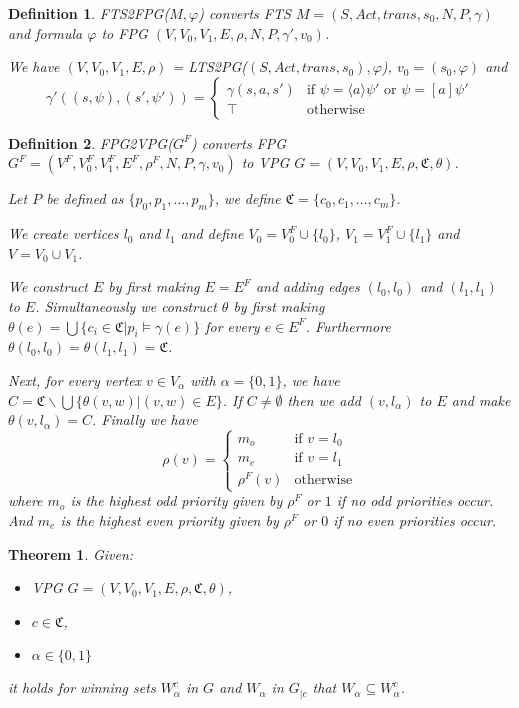 \documentclass[]{article}
\newtheorem{definition}{Definition}[section]
\newtheorem{theorem}{Theorem}[section]
\begin{document}
\begin{definition}
	FTS2FPG($M, \varphi$) converts FTS $M = (S, Act, trans, s_0, N, P, \gamma)$ and formula $\varphi$ to FPG $(V, V_0, V_1, E, \rho, N, P, \gamma', v_0)$.
	
	We have $(V, V_0, V_1, E, \rho)$ = LTS2PG($(S, Act, trans, s_0), \varphi$), $v_0 = (s_0, \varphi)$ and
	\[ \gamma'((s, \psi),(s', \psi')) = \begin{cases}
	\gamma(s,a,s') & \text{if }\psi = \langle a \rangle \psi'\text{ or }\psi = [a]\psi' \\
	\top & \text{otherwise}
	\end{cases}\]
\end{definition}

\begin{definition}
	FPG2VPG($G^F$) converts FPG $G^F = (V^F, V_0^F, V_1^F, E^F, \rho^F, N, P, \gamma, v_0)$ to VPG $G = (V, V_0, V_1, E, \rho, \mathfrak{C}, \theta)$.
	
	Let $P$ be defined as  $\{p_0, p_1, \dots, p_m\}$, we define $\mathfrak{C} = \{c_0, c_1, \dots, c_m\}$.
	
	We create vertices $l_0$ and $l_1$ and define $V_0 = V_0^F \cup \{l_0\}$, $V_1 = V_1^F \cup \{l_1\}$ and $V = V_0 \cup V_1$.
	
	We construct $E$ by first making $E = E^F$ and adding edges $(l_0, l_0)$ and $(l_1, l_1)$ to $E$. Simultaneously we construct $\theta$ by first making $\theta(e) = \bigcup\{c_i \in \mathfrak{C} | p_i \models \gamma(e)\}$ for every $e \in E^F$. Furthermore $\theta(l_0,l_0) = \theta(l_1,l_1) = \mathfrak{C}$.
	
	Next, for every vertex $v \in V_\alpha$ with $\alpha = \{0,1\}$, we have $C = \mathfrak{C} \backslash \bigcup \{\theta(v,w)|(v,w) \in E\}$. If $C \neq \emptyset$ then we add $(v, l_\alpha)$ to $E$ and make $\theta(v,l_\alpha) = C$.
	Finally we have 
	\[ \rho(v) = \begin{cases}
	m_o  & \text{if } v = l_0 \\
	m_e & \text{if } v = l_1 \\
	\rho^F(v) &\text{otherwise}
	\end{cases} \]
	where $m_o$ is the highest odd priority given by $\rho^F$ or $1$ if no odd priorities occur. And $m_e$ is the highest even priority given by $\rho^F$ or $0$ if no even priorities occur.
\end{definition}
\begin{theorem}
	\label{vpgproj}
	Given:
	\begin{itemize}
		\item VPG $G = (V,V_0, V_1, E, \rho, \mathfrak{C}, \theta)$,
		\item $c \in \mathfrak{C}$,
		\item $\alpha \in \{0,1\}$
	\end{itemize}
	it holds for winning sets $W_\alpha^c$ in $G$ and $W_\alpha$ in $G_{|c}$ that $W_\alpha \subseteq W_\alpha^c$.
\end{theorem}
\end{document}
